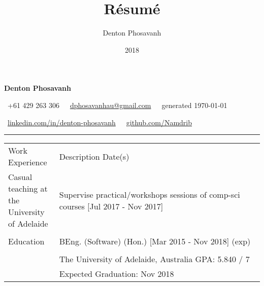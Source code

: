 \documentclass[a4paper]{article}
\title{R\'{e}sum\'{e}}
\author{Denton Phosavanh}
\date{2018}
\begin{document}
	\centering %
	{\LARGE \textbf{Denton Phosavanh}}

	\faMobilePhone\ +61 429 263 306\ \ \faInbox\ \href{mailto:dphosavanhau@gmail.com}{dphosavanhau@gmail.com}\ \ \faCalendar\ generated \today

	\faLinkedinSign\ \href{https://www.linkedin.com/in/denton-phosavanh}{linkedin.com/in/denton-phosavanh}\ \ \faGithub\ \href{https://www.github.com/Namdrib}{github.com/Namdrib}
	\hrule
	\vspace{10px}


	\centering
	\begin{tabu} to 
		\rowfont{\bfseries\large} Work Experience & Description \hfill Date(s) \\
		Casual teaching at the University of Adelaide & Supervise practical/workshops sessions of comp-sci courses \hfill [Jul 2017 - Nov 2017] \\

		& \\
		\rowfont{\bfseries\large} Education & BEng. (Software) (Hon.) \hfill [Mar 2015 - Nov 2018] (exp) \\

		& \\
		& The University of Adelaide, Australia \hfill GPA: 5.840 / 7 \\
		& Expected Graduation: Nov 2018 \\


\end{tabu}
\end{document}

